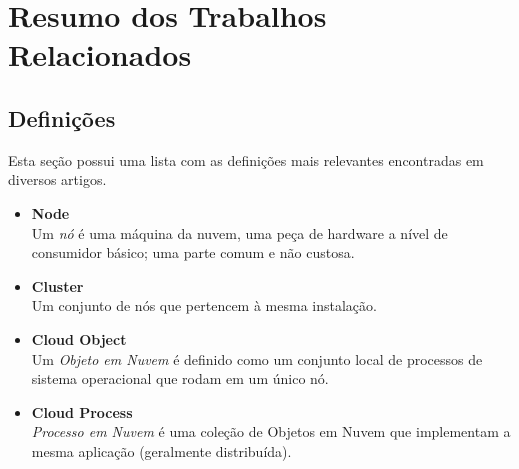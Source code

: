 \documentclass{llncs}
\begin{document}
\section{Resumo dos Trabalhos Relacionados}


\subsection{Definições}
\quad Esta seção possui uma lista com as definições mais relevantes encontradas em diversos artigos.

\begin{itemize}
\item \textbf{Node \cite{pia}} \\
Um \emph{nó} é uma máquina da nuvem, uma peça de hardware a nível de consumidor básico; uma parte comum e não custosa.\\

\item \textbf{Cluster \cite{pia}} \\
Um conjunto de nós que pertencem à mesma instalação.\\

\item \textbf{Cloud Object \cite{pia}} \\
Um \emph{Objeto em Nuvem} é definido como um conjunto local de processos de sistema operacional que rodam em um único nó. \\

\item \textbf{Cloud Process \cite{pia}} \\
\emph{Processo em Nuvem} é uma coleção de Objetos em Nuvem que implementam a mesma aplicação (geralmente distribuída). \\

\end{itemize}


\end{document}
